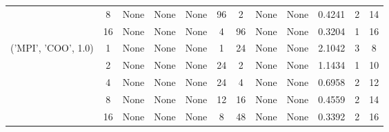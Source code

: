 \begin{tabular}{cccccccccccc}
& 8& None& None& None& 96& 2& None& None& 0.4241& 2& 14\\
& 16& None& None& None& 4& 96& None& None& 0.3204& 1& 16\\
\hline
\multirow{5}{*}{('MPI', 'COO', 1.0)}& 1& None& None& None& 1& 24& None& None& 2.1042& 3& 8\\
& 2& None& None& None& 24& 2& None& None& 1.1434& 1& 10\\
& 4& None& None& None& 24& 4& None& None& 0.6958& 2& 12\\
& 8& None& None& None& 12& 16& None& None& 0.4559& 2& 14\\
& 16& None& None& None& 8& 48& None& None& 0.3392& 2& 16\\
\hline
\end{tabular}
